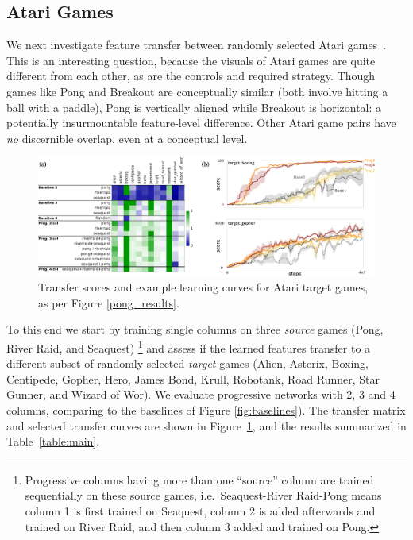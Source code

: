 
\subsection{Atari Games}

We next investigate feature transfer between randomly
selected Atari games~\cite{bellemare13arcade}. This is an interesting question, because the visuals of
Atari games are quite different from each other, as are the controls
and required strategy. Though games like Pong and Breakout are
conceptually similar (both involve hitting a ball with a
paddle), Pong is vertically aligned while
Breakout is horizontal: a potentially insurmountable
feature-level difference. Other Atari game pairs have \emph{no} discernible
overlap, even at a conceptual level.

\begin{figure}[h]
  \centering
    \includegraphics[width=.95\textwidth]{figures/transfer_atari.pdf}
    \caption{Transfer scores and example learning curves for Atari target games,
      as per Figure \ref{pong_results}.}
    \label{fig:atari_results}
\end{figure}

To this end we start by training single columns on three \emph{source}
games (Pong, River Raid, and Seaquest)
\footnote{Progressive columns having more than one ``source'' column are trained
sequentially on these source games, i.e.\ Seaquest-River Raid-Pong means column 1 is first trained
on Seaquest, column 2 is added afterwards and trained on River Raid, and then column 3 added and
trained on Pong.}
and assess if the learned features transfer to a different subset of
randomly selected \emph{target} games (Alien, Asterix, Boxing, Centipede,
Gopher, Hero, James Bond, Krull, Robotank, Road Runner, Star Gunner,
and Wizard of Wor). We evaluate progressive networks with 2, 3 and 4
columns, comparing to the baselines of Figure \ref{fig:baselines}).
The transfer matrix and selected transfer curves are shown in
Figure~\ref{fig:atari_results}, and the results summarized in
Table~\ref{table:main}.

